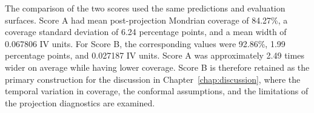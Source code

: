 The comparison of the two scores used the same predictions and evaluation surfaces. Score A had mean post-projection Mondrian coverage of 84.27\%, a coverage standard deviation of 6.24 percentage points, and a mean width of 0.067806 IV units. For Score B, the corresponding values were 92.86\%, 1.99 percentage points, and 0.027187 IV units. Score A was approximately 2.49 times wider on average while having lower coverage. Score B is therefore retained as the primary construction for the discussion in Chapter~\ref{chap:discussion}, where the temporal variation in coverage, the conformal assumptions, and the limitations of the projection diagnostics are examined.
